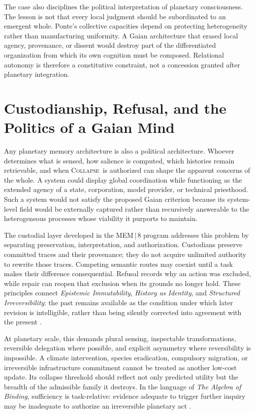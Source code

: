 \documentclass[11pt]{article}
\newcommand{\Collapse}{\textsc{Collapse}}
\begin{document}
The case also disciplines the political interpretation of planetary consciousness. The lesson is not that every local judgment should be subordinated to an emergent whole. Ponte's collective capacities depend on protecting heterogeneity rather than manufacturing uniformity. A Gaian architecture that erased local agency, provenance, or dissent would destroy part of the differentiated organization from which its own cognition must be composed. Relational autonomy is therefore a constitutive constraint, not a concession granted after planetary integration.

\section{Custodianship, Refusal, and the Politics of a Gaian Mind}

Any planetary memory architecture is also a political architecture. Whoever determines what is sensed, how salience is computed, which histories remain retrievable, and when \Collapse\ is authorized can shape the apparent concerns of the whole. A system could display global coordination while functioning as the extended agency of a state, corporation, model provider, or technical priesthood. Such a system would not satisfy the proposed Gaian criterion because its system-level field would be externally captured rather than recursively answerable to the heterogeneous processes whose viability it purports to maintain.

The custodial layer developed in the MEM\,$|$\,8 program addresses this problem by separating preservation, interpretation, and authorization. Custodians preserve committed traces and their provenance; they do not acquire unlimited authority to rewrite those traces. Competing semantic routes may coexist until a task makes their difference consequential. Refusal records why an action was excluded, while repair can reopen that exclusion when its grounds no longer hold. These principles connect \emph{Epistemic Immutability}, \emph{History as Identity}, and \emph{Structured Irreversibility}: the past remains available as the condition under which later revision is intelligible, rather than being silently corrected into agreement with the present \cite{flyxionEI,flyxionHistory,flyxionIrreversibility}.

At planetary scale, this demands plural sensing, inspectable transformations, reversible delegation where possible, and explicit asymmetry where reversibility is impossible. A climate intervention, species eradication, compulsory migration, or irreversible infrastructure commitment cannot be treated as another low-cost update. Its collapse threshold should reflect not only predicted utility but the breadth of the admissible family it destroys. In the language of \emph{The Algebra of Binding}, sufficiency is task-relative: evidence adequate to trigger further inquiry may be inadequate to authorize an irreversible planetary act \cite{flyxionBinding}.
\end{document}
